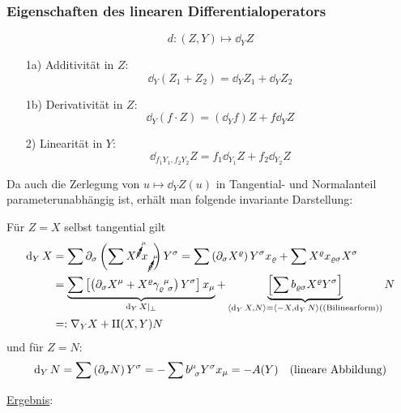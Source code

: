 \subsubsection{Eigenschaften des linearen Differentialoperators}
\[
 d \colon (Z,Y) \mapsto \dd_Y Z
\]
\begin{enumerate}
 \item[1a)] Additivität in \(Z\):
 \[
  \dd_Y (Z_1 + Z_2) = \dd_Y Z_1 + \dd_Y Z_2
 \]
 \item[1b)] Derivativität in \(Z\):
 \[
  \dd_Y(f \cdot Z) = (\dd_Y f)Z + f \dd_Y Z
 \]
 \item[2)] Linearität in \(Y\):
 \[
  \dd_{f_1 Y_1, f_2 Y_2} Z = f_1 \dd_{Y_1} Z + f_2 \dd_{Y_2} Z
 \]
\end{enumerate}
Da auch die Zerlegung von \(u \mapsto \dd_Y Z(u)\) in Tangential- und Normalanteil parameterunabhängig ist, erhält man folgende invariante Darstellung: \par
Für \(Z = X\) selbst tangential gilt
\begin{align*}
 \dd_Y X &= \sum \partial_{\sigma} \left( \sum X^{\cancelto{\mu}{\varrho}} x_{\cancelto{\mu}{\varrho}}\right)Y^\sigma = \sum \left( \partial_\sigma X^\varrho \right) Y^\sigma x_\varrho + \sum X^\varrho x_{\varrho \sigma} X^\sigma \\
 &=\underbrace{\sum \left[ \left( \partial_\sigma X^\mu + X^\varrho \christ \varrho \mu \sigma \right) Y^\sigma \right] x_\mu}_{\dd_Y X |_\perp} + \underbrace{\left[ \sum b_{\varrho \sigma} X^\varrho Y^\sigma \right]}_{\langle \dd_Y X, N\rangle = \langle- X, \dd_Y N \rangle (\text{(Bilinearform)})} N \\
 &=: \nabla_Y X + \Rom 2 (X,Y) N
\end{align*}
und für \(Z = N\):
\begin{align*}
 \operatorname{d}_Y N = \sum \left( \partial_\sigma N\right) Y^\sigma = - \sum b^{\mu}_{\;\, \sigma} Y^\sigma x_\mu = -A(Y) \quad \text{(lineare Abbildung)}
\end{align*}

\uline{Ergebnis}:

